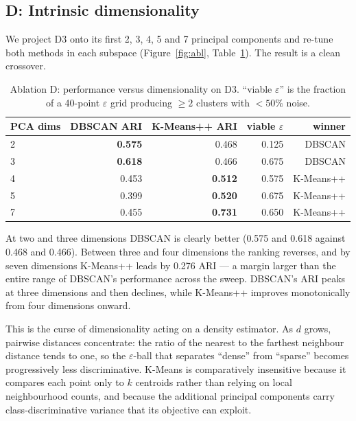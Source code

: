 \documentclass[11pt,a4paper]{article}
\begin{document}
\subsection{D: Intrinsic dimensionality}\label{sec:dim}
We project D3 onto its first 2, 3, 4, 5 and 7 principal components and re-tune
both methods in each subspace (Figure~\ref{fig:abl}, Table~\ref{tab:dim}). The
result is a clean crossover.

\begin{table}[h]\centering\small
\caption{Ablation D: performance versus dimensionality on D3. ``viable
$\varepsilon$'' is the fraction of a 40-point $\varepsilon$ grid producing
$\geq2$ clusters with $<50\%$ noise.}
\label{tab:dim}
\begin{tabular}{lrrrr}
\toprule
\textbf{PCA dims} & \textbf{DBSCAN ARI} & \textbf{K-Means++ ARI} &
\textbf{viable $\varepsilon$} & \textbf{winner} \\
\midrule
2 & \textbf{0.575} & 0.468 & 0.125 & DBSCAN \\
3 & \textbf{0.618} & 0.466 & 0.675 & DBSCAN \\
4 & 0.453 & \textbf{0.512} & 0.575 & K-Means++ \\
5 & 0.399 & \textbf{0.520} & 0.675 & K-Means++ \\
7 & 0.455 & \textbf{0.731} & 0.650 & K-Means++ \\
\bottomrule
\end{tabular}
\end{table}

At two and three dimensions DBSCAN is clearly better (0.575 and 0.618 against
0.468 and 0.466). Between three and four dimensions the ranking reverses, and by
seven dimensions K-Means++ leads by 0.276 ARI --- a margin larger than the entire
range of DBSCAN's performance across the sweep. DBSCAN's ARI peaks at three
dimensions and then declines, while K-Means++ improves monotonically from four
dimensions onward.

This is the curse of dimensionality acting on a density estimator. As $d$ grows,
pairwise distances concentrate: the ratio of the nearest to the farthest
neighbour distance tends to one, so the $\varepsilon$-ball that separates
``dense'' from ``sparse'' becomes progressively less discriminative. K-Means is
comparatively insensitive because it compares each point only to $k$ centroids
rather than relying on local neighbourhood counts, and because the additional
principal components carry class-discriminative variance that its objective can
exploit.
\end{document}
